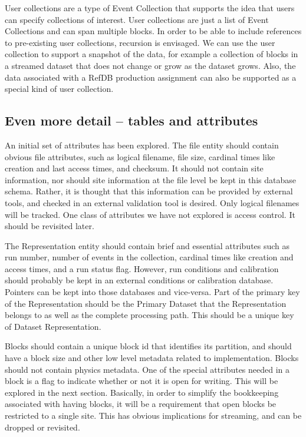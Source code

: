 \documentclass{cmspaper}
\begin{document}
User collections are a type of Event Collection that supports the idea that users can specify 
collections of interest.  User collections are just a list of Event Collections
and can span multiple blocks.  
In order to be able to include references to pre-existing user collections, recursion is 
envisaged.  We can use the user collection to support a snapshot of the data, for example 
a collection of blocks in a streamed dataset that does not change or grow as the dataset 
grows.  Also, the data associated with a RefDB production assignment can also be supported 
as a special kind of user collection.


\subsection{Even more detail -- tables and attributes}

An initial set of attributes has been explored.  The file entity should contain obvious 
file attributes, such as logical filename, file size, cardinal times like creation and 
last access times, and checksum.  It should not contain site information, nor should 
site information at the file level be kept in this database schema.  Rather, it is 
thought that this information can be provided by external tools, and checked in an 
external validation tool is desired.  Only logical filenames will be tracked. One 
class of attributes we have not explored is access control.  It should be revisited later.

The Representation entity should contain brief and essential attributes such as run number, 
number of events in the collection, cardinal times like creation and access times, 
and a run status flag.  However, run conditions and calibration should probably 
be kept in  an external conditions or calibration database.  Pointers can be kept 
into those databases and vice-versa.  Part of the primary key of the Representation
should be the Primary Dataset that the Representation 
belongs to as well as the complete processing path.  This should be a unique key of 
Dataset Representation.  

Blocks should contain a unique block id that identifies its partition, and should 
have a block size and other low level metadata related to implementation.  Blocks 
should not contain physics metadata.  One of the special attributes needed in a 
block is a flag to indicate whether or not it is open for writing.  This will be 
explored in the next section.  Basically, in order to simplify the bookkeeping 
associated with having blocks, it will be a requirement that open blocks be 
restricted to a single site.  This has obvious implications for streaming, and 
can be dropped or revisited. 
\end{document}
